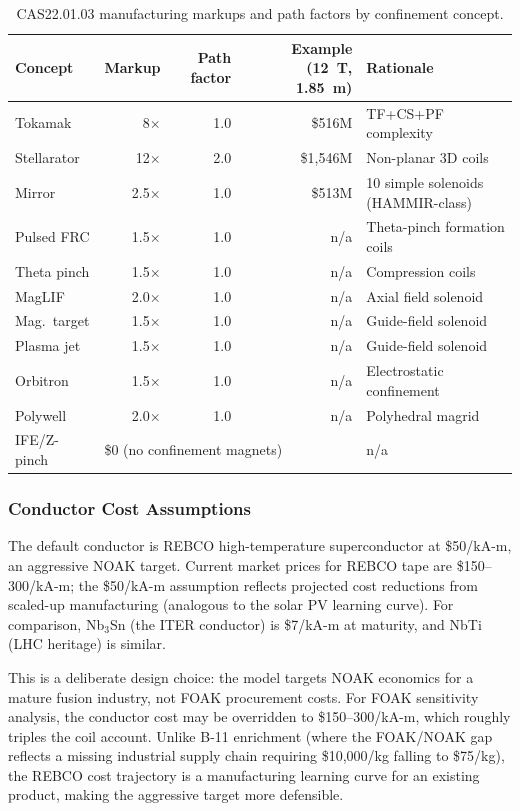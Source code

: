 \documentclass{article}
\begin{document}
\begin{table}[htbp]
\caption{CAS22.01.03 manufacturing markups and path factors by confinement concept.}
\label{tab:cas2203-markup}
\centering
\begin{tabular}{lrrrl}
\toprule
Concept & Markup & Path factor & Example (12~T, 1.85~m) & Rationale \\
\midrule
Tokamak     &  8$\times$ & 1.0 & \$516M & TF+CS+PF complexity \\
Stellarator & 12$\times$ & 2.0 & \$1{,}546M & Non-planar 3D coils \\
Mirror      &  2.5$\times$ & 1.0 & \$513M & 10 simple solenoids (HAMMIR-class) \\
Pulsed FRC  &  1.5$\times$ & 1.0 & n/a & Theta-pinch formation coils \\
Theta pinch &  1.5$\times$ & 1.0 & n/a & Compression coils \\
MagLIF      &  2.0$\times$ & 1.0 & n/a & Axial field solenoid \\
Mag.\ target &  1.5$\times$ & 1.0 & n/a & Guide-field solenoid \\
Plasma jet  &  1.5$\times$ & 1.0 & n/a & Guide-field solenoid \\
Orbitron    &  1.5$\times$ & 1.0 & n/a & Electrostatic confinement \\
Polywell    &  2.0$\times$ & 1.0 & n/a & Polyhedral magrid \\
IFE/Z-pinch & \multicolumn{3}{l}{\$0 (no confinement magnets)} & n/a \\
\bottomrule
\end{tabular}
\end{table}

\subsubsection{Conductor Cost Assumptions}
The default conductor is REBCO high-temperature superconductor at
\$50/kA-m, an aggressive NOAK target.  Current market prices for
REBCO tape are \$150--300/kA-m; the \$50/kA-m assumption reflects
projected cost reductions from scaled-up manufacturing (analogous to
the solar PV learning curve).  For comparison, Nb$_3$Sn (the ITER
conductor) is \$7/kA-m at maturity, and NbTi (LHC heritage) is
similar.

This is a deliberate design choice: the model targets NOAK economics
for a mature fusion industry, not FOAK procurement costs.  For FOAK
sensitivity analysis, the conductor cost may be overridden to
\$150--300/kA-m, which roughly triples the coil account.
Unlike B-11 enrichment (where the FOAK/NOAK gap reflects a missing
industrial supply chain requiring \$10{,}000/kg falling to \$75/kg), the
REBCO cost trajectory is a manufacturing learning curve for an
existing product, making the aggressive target more defensible.
\end{document}
